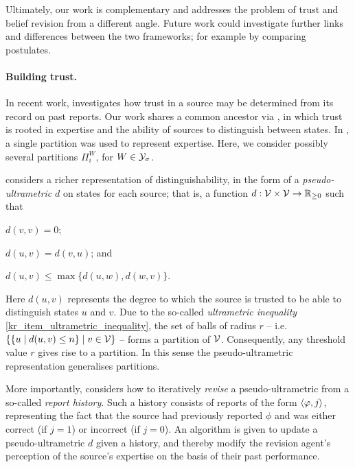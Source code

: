 Ultimately, our work is complementary and addresses the problem of trust and
belief revision from a different angle. Future work could investigate further
links and differences between the two frameworks; for example by comparing
postulates.


\paragraph{Building trust.} In recent work, \textcite{hunter_building_21}
investigates how trust in a source may be determined from its record on past
reports. Our work shares a common ancestor via \cite{booth_trust_2018}, in
which trust is rooted in expertise and the ability of sources to distinguish
between states. In \cite{booth_trust_2018}, a single partition was used to
represent expertise. Here, we consider possibly several partitions $\Pi^W_i$,
for $W \in \mathcal{Y}_\sigma$.

\textcite{hunter_building_21} considers a richer representation of
distinguishability, in the form of a \emph{pseudo-ultrametric} $d$ on states
for each source; that is, a function $d: \mathcal{V} \times \mathcal{V} \to \mathbb{R}_{\ge 0}$
such that
\begin{inlinelist}
    \item $d(v, v) = 0$;
    \item $d(u, v) = d(v, u)$; and
    \item\label{kr_item_ultrametric_inequality}
        $d(u, v) \le \max\{d(u, w), d(w, v)\}$.
\end{inlinelist}
Here $d(u, v)$ represents the degree to which the source is trusted to be able
to distinguish states $u$ and $v$. Due to the so-called \emph{ultrametric
inequality} \cref{kr_item_ultrametric_inequality}, the set of balls of radius
$r$ -- i.e. $\{\{u \mid d(u, v) \le n\} \mid v \in \mathcal{V}\}$ -- forms a
partition of $\mathcal{V}$. Consequently, any threshold value $r$ gives rise to a
partition. In this sense the pseudo-ultrametric representation generalises
partitions.

More importantly, \textcite{hunter_building_21} considers how to iteratively
\emph{revise} a pseudo-ultrametric from a so-called \emph{report history}. Such
a history consists of reports of the form $\langle {\varphi, j} \rangle$, representing the
fact that the source had previously reported $\phi$ and was either correct (if
$j = 1$) or incorrect (if $j = 0$). An algorithm is given to update a
pseudo-ultrametric $d$ given a history, and thereby modify the revision agent's
perception of the source's expertise on the basis of their past performance.

